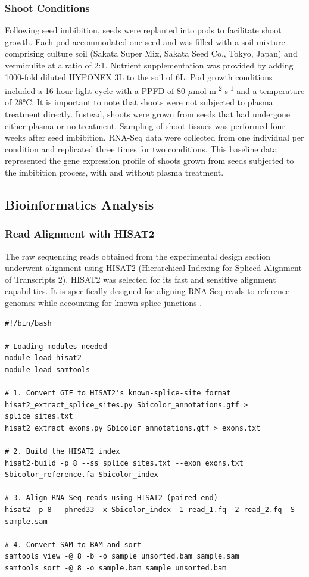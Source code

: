 \documentclass[12pt,letterpaper]{article}
\begin{document}
\subsubsection{Shoot Conditions}
Following seed imbibition, seeds were replanted into pods to facilitate shoot growth. Each pod accommodated one seed and was filled with a soil mixture comprising culture soil (Sakata Super Mix, Sakata Seed Co., Tokyo, Japan) and vermiculite at a ratio of 2:1. Nutrient supplementation was provided by adding 1000-fold diluted HYPONEX 3L to the soil of 6L. Pod growth conditions included a 16-hour light cycle with a PPFD of 80 $\mu$mol m\textsuperscript{-2} s\textsuperscript{-1} and a temperature of 28°C. It is important to note that shoots were not subjected to plasma treatment directly. Instead, shoots were grown from seeds that had undergone either plasma or no treatment. Sampling of shoot tissues was performed four weeks after seed imbibition. RNA-Seq data were collected from one individual per condition and replicated three times for two conditions. This baseline data represented the gene expression profile of shoots grown from seeds subjected to the imbibition process, with and without plasma treatment.


\subsection{Bioinformatics Analysis}

\subsubsection{Read Alignment with HISAT2}
The raw sequencing reads obtained from the experimental design section underwent alignment using HISAT2 (Hierarchical Indexing for Spliced Alignment of Transcripts 2). HISAT2 was selected for its fast and sensitive alignment capabilities. It is specifically designed for aligning RNA-Seq reads to reference genomes while accounting for known splice junctions \parencite{kim2019hisat2}.

\clearpage

\begin{lstlisting}[caption={Example Bash Code for Read Alignment with HISAT2 and Samtools.},captionpos=b]
#!/bin/bash

# Loading modules needed
module load hisat2
module load samtools

# 1. Convert GTF to HISAT2's known-splice-site format
hisat2_extract_splice_sites.py Sbicolor_annotations.gtf > splice_sites.txt
hisat2_extract_exons.py Sbicolor_annotations.gtf > exons.txt

# 2. Build the HISAT2 index
hisat2-build -p 8 --ss splice_sites.txt --exon exons.txt Sbicolor_reference.fa Sbicolor_index

# 3. Align RNA-Seq reads using HISAT2 (paired-end)
hisat2 -p 8 --phred33 -x Sbicolor_index -1 read_1.fq -2 read_2.fq -S sample.sam 

# 4. Convert SAM to BAM and sort
samtools view -@ 8 -b -o sample_unsorted.bam sample.sam
samtools sort -@ 8 -o sample.bam sample_unsorted.bam
\end{lstlisting}
\end{document}
